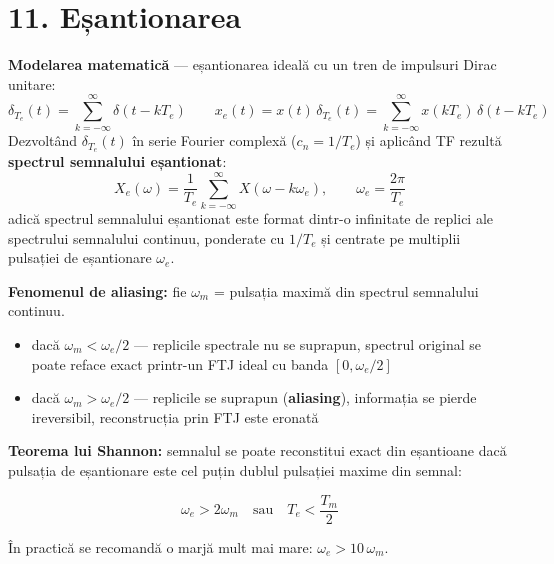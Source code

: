 \documentclass[10pt,a4paper]{article}
\begin{document}
\section*{11. Eșantionarea}
\textbf{Modelarea matematică} — eșantionarea ideală cu un tren de impulsuri Dirac unitare:
$$\delta_{T_e}(t)=\sum_{k=-\infty}^{\infty}\delta(t-kT_e) \qquad x_e(t)=x(t)\,\delta_{T_e}(t)=\sum_{k=-\infty}^{\infty}x(kT_e)\,\delta(t-kT_e)$$
Dezvoltând $\delta_{T_e}(t)$ în serie Fourier complexă ($c_n=1/T_e$) și aplicând TF rezultă \textbf{spectrul semnalului eșantionat}:
$$X_e(\omega)=\dfrac{1}{T_e}\sum_{k=-\infty}^{\infty}X(\omega-k\omega_e), \qquad \omega_e=\dfrac{2\pi}{T_e}$$
adică spectrul semnalului eșantionat este format dintr-o infinitate de replici ale spectrului semnalului continuu, ponderate cu $1/T_e$ și centrate pe multiplii pulsației de eșantionare $\omega_e$.

\textbf{Fenomenul de aliasing:} fie $\omega_m$ = pulsația maximă din spectrul semnalului continuu.
\begin{itemize}
\item dacă $\omega_m<\omega_e/2$ — replicile spectrale nu se suprapun, spectrul original se poate reface exact printr-un FTJ ideal cu banda $[0,\omega_e/2]$
\item dacă $\omega_m>\omega_e/2$ — replicile se suprapun (\textbf{aliasing}), informația se pierde ireversibil, reconstrucția prin FTJ este eronată
\end{itemize}

\textbf{Teorema lui Shannon:} semnalul se poate reconstitui exact din eșantioane dacă pulsația de eșantionare este cel puțin dublul pulsației maxime din semnal:
\begin{keyeq}\color{red!65!black}
$$\omega_e>2\omega_m \quad\text{sau}\quad T_e<\dfrac{T_m}{2}$$
\end{keyeq}
În practică se recomandă o marjă mult mai mare: $\omega_e>10\,\omega_m$.

\begin{center}

\vspace{3mm}

\end{center}
\end{document}
